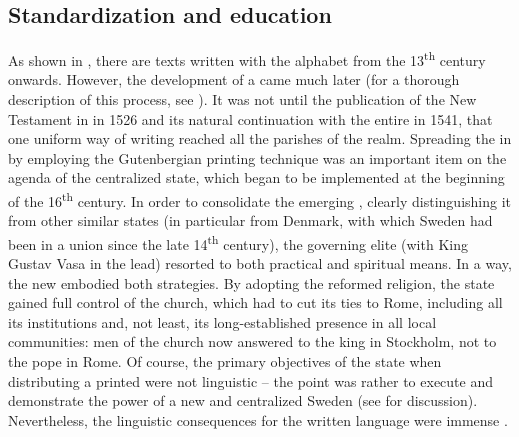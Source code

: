 \documentclass[output=paper]{langscibook}
\begin{document}
\subsection{Standardization and education}\label{sec:intro:2.1}


As shown in , there are  texts written with the  alphabet from the 13\textsuperscript{th} century onwards. However, the development of a  came much later (for a thorough description of this process, see \citealt{Teleman2002}). It was not until the publication of the New Testament in  in 1526 and its natural continuation with the entire  in 1541, that one uniform way of writing  reached all the parishes of the realm. Spreading the  in  by employing the Gutenbergian printing technique was an important item on the agenda of the centralized  state, which began to be implemented at the beginning of the 16\textsuperscript{th} century. In order to consolidate the emerging , clearly distinguishing it from other similar states (in particular from Denmark, with which Sweden had been in a union since the late 14\textsuperscript{th} century), the governing elite (with King Gustav Vasa in the lead) resorted to both practical and spiritual means. In a way, the new  embodied both strategies. By adopting the reformed religion, the state gained full control of the church, which had to cut its ties to Rome, including all its institutions and, not least, its long-established presence in all local communities: men of the church now answered to the king in Stockholm, not to the pope in Rome. Of course, the primary objectives of the state when distributing a printed  were not linguistic – the point was rather to execute and demonstrate the power of a new and centralized Sweden (see \citealt{Kouri1994} for discussion). Nevertheless, the linguistic consequences for the written language were immense \parencite{Stahle1970}.
\end{document}
